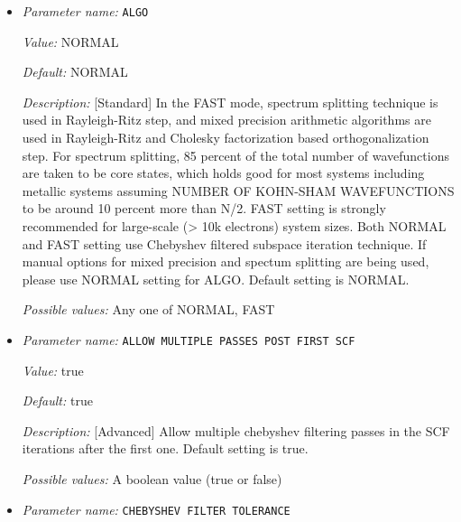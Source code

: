 \begin{itemize}
\item {\it Parameter name:} {\tt ALGO}
\label{parameters:SCF parameters/Eigen_2dsolver parameters/ALGO}
\label{parameters:SCF_20parameters/Eigen_2dsolver_20parameters/ALGO}


{\it Value:} NORMAL


{\it Default:} NORMAL


{\it Description:} [Standard] In the FAST mode, spectrum splitting technique is used in Rayleigh-Ritz step, and mixed precision arithmetic algorithms are used in Rayleigh-Ritz and Cholesky factorization based orthogonalization step. For spectrum splitting, 85 percent of the total number of wavefunctions are taken to be core states, which holds good for most systems including metallic systems assuming NUMBER OF KOHN-SHAM WAVEFUNCTIONS to be around 10 percent more than N/2. FAST setting is strongly recommended for large-scale (> 10k electrons) system sizes. Both NORMAL and FAST setting use Chebyshev filtered subspace iteration technique. If manual options for mixed precision and spectum splitting are being used, please use NORMAL setting for ALGO. Default setting is NORMAL.


{\it Possible values:} Any one of NORMAL, FAST
\item {\it Parameter name:} {\tt ALLOW MULTIPLE PASSES POST FIRST SCF}
\label{parameters:SCF parameters/Eigen_2dsolver parameters/ALLOW MULTIPLE PASSES POST FIRST SCF}
\label{parameters:SCF_20parameters/Eigen_2dsolver_20parameters/ALLOW_20MULTIPLE_20PASSES_20POST_20FIRST_20SCF}


{\it Value:} true


{\it Default:} true


{\it Description:} [Advanced] Allow multiple chebyshev filtering passes in the SCF iterations after the first one. Default setting is true.


{\it Possible values:} A boolean value (true or false)
\item {\it Parameter name:} {\tt CHEBYSHEV FILTER TOLERANCE}
\label{parameters:SCF parameters/Eigen_2dsolver parameters/CHEBYSHEV FILTER TOLERANCE}
\label{parameters:SCF_20parameters/Eigen_2dsolver_20parameters/CHEBYSHEV_20FILTER_20TOLERANCE}



\end{itemize}
